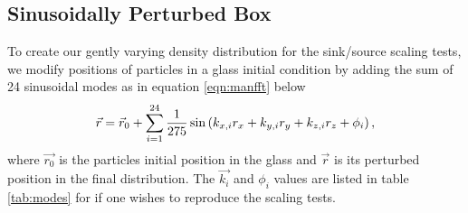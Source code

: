 \documentclass[fleq,usenatbib]{mnras}
\begin{document}
\subsection{Sinusoidally Perturbed Box}
To create our gently varying density distribution for the sink/source scaling 
tests, we modify positions of particles in a glass initial condition by adding 
the sum of 24 sinusoidal modes as in equation \ref{eqn:manfft} below
\begin{equation}\label{eqn:manfft}
\vec{r} = \vec{r}_{\rm 0} + \sum_{i=1}^{24} \frac{1}{275} \sin 
\left( k_{x,i} r_x + k_{y,i} r_y + k_{z,i} r_z + \phi_i\right),
\end{equation}
where $\vec{r_0}$ is the particles initial position in the glass and $\vec{r}$ 
is its perturbed position in the final distribution. The $\vec{k_i}$ and 
$\phi_i$ values are listed in table \ref{tab:modes} for if one wishes to 
reproduce the scaling tests.  
\end{document}
